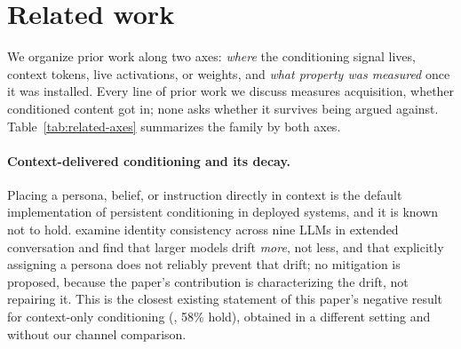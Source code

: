 \iflongversion
\section{Related work}
\label{sec:related}

We organize prior work along two axes: \emph{where} the conditioning signal lives,
context tokens, live activations, or weights, and \emph{what property was measured}
once it was installed. Every line of prior work we discuss measures acquisition, whether
conditioned content got in; none asks whether it survives being argued against.
Table~\ref{tab:related-axes} summarizes the family by both axes.

\paragraph{Context-delivered conditioning and its decay.} Placing a persona, belief, or
instruction directly in context is the default implementation of persistent conditioning
in deployed systems, and it is known not to hold. \citet{choi2024identitydrift} examine
identity consistency across nine LLMs in extended conversation and find that larger
models drift \emph{more}, not less, and that explicitly assigning a persona does not
reliably prevent that drift; no mitigation is proposed, because the paper's contribution
is characterizing the drift, not repairing it. This is the closest existing statement of
this paper's negative result for context-only conditioning (\condB{}, 58\% hold), obtained in
a different setting and without our channel comparison.

